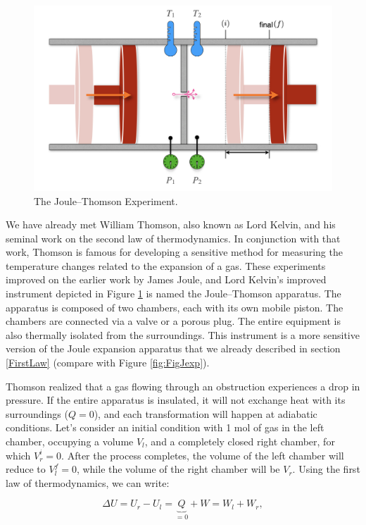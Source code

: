 \documentclass[
  9pt,
]{extbook}
\theoremstyle{definition}
\theoremstyle{definition}
\theoremstyle{definition}
\theoremstyle{remark}
\begin{document}
\begin{figure}

{\centering \includegraphics[width=0.8\linewidth]{./img/OEP_Figures.015} 

}

\caption{The Joule–Thomson Experiment.}\label{fig:FigJT}
\end{figure}

We have already met William Thomson, also known as Lord Kelvin, and his seminal work on the second law of thermodynamics. In conjunction with that work, Thomson is famous for developing a sensitive method for measuring the temperature changes related to the expansion of a gas. These experiments improved on the earlier work by James Joule, and Lord Kelvin's improved instrument depicted in Figure \ref{fig:FigJT} is named the Joule--Thomson apparatus. The apparatus is composed of two chambers, each with its own mobile piston. The chambers are connected via a valve or a porous plug. The entire equipment is also thermally isolated from the surroundings. This instrument is a more sensitive version of the Joule expansion apparatus that we already described in section \ref{FirstLaw} (compare with Figure \ref{fig:FigJexp}).

Thomson realized that a gas flowing through an obstruction experiences a drop in pressure. If the entire apparatus is insulated, it will not exchange heat with its surroundings (\(Q=0\)), and each transformation will happen at adiabatic conditions. Let's consider an initial condition with 1 mol of gas in the left chamber, occupying a volume \(V_l\), and a completely closed right chamber, for which \(V_r^i=0\). After the process completes, the volume of the left chamber will reduce to \(V_l^f=0\), while the volume of the right chamber will be \(V_r\). Using the first law of thermodynamics, we can write:

\begin{equation}
\Delta U=U_r-U_l=\underbrace{Q}_{=0}+W=W_l+W_r,
\label{eq:JT1}
\end{equation}
\end{document}
